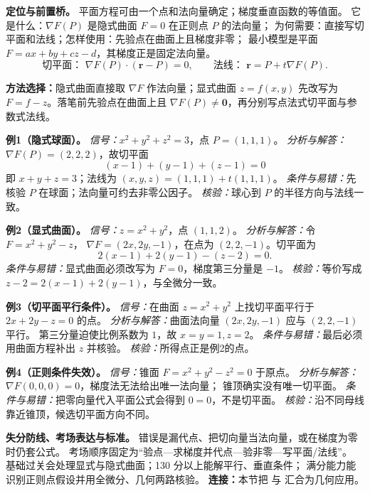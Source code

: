 
\begin{knowledgeBox}
\textbf{定位与前置桥。}
平面方程可由一个点和法向量确定；梯度垂直函数的等值面。
它是什么：\(\nabla F(P)\) 是隐式曲面 \(F=0\) 在正则点 \(P\) 的法向量；
为何需要：直接写切平面和法线；怎样使用：先验点在曲面上且梯度非零；
最小模型是平面 \(F=ax+by+cz-d\)，其梯度正是固定法向量。
\[
\text{切平面： }\nabla F(P)\cdot(\boldsymbol r-P)=0,\qquad
\text{法线： }\boldsymbol r=P+t\nabla F(P).
\]

\textbf{方法选择：}隐式曲面直接取 \(\nabla F\) 作法向量；显式曲面
\(z=f(x,y)\) 先改写为 \(F=f-z\)。落笔前先验点在曲面上且
\(\nabla F(P)\ne\boldsymbol0\)，再分别写点法式切平面与参数式法线。

\textbf{例1（隐式球面）。}
\emph{信号：}\(x^2+y^2+z^2=3\)，点 \(P=(1,1,1)\)。
\emph{分析与解答：}\(\nabla F(P)=(2,2,2)\)，故切平面
\[
(x-1)+(y-1)+(z-1)=0
\]
即 \(x+y+z=3\)；法线为
\((x,y,z)=(1,1,1)+t(1,1,1)\)。
\emph{条件与易错：}先核验 \(P\) 在球面；法向量可约去非零公因子。
\emph{核验：}球心到 \(P\) 的半径方向与法线一致。

\textbf{例2（显式曲面）。}
\emph{信号：}\(z=x^2+y^2\)，点 \((1,1,2)\)。
\emph{分析与解答：}令 \(F=x^2+y^2-z\)，
\(\nabla F=(2x,2y,-1)\)，在点为 \((2,2,-1)\)。切平面为
\[
2(x-1)+2(y-1)-(z-2)=0.
\]
\emph{条件与易错：}显式曲面必须改写为 \(F=0\)，梯度第三分量是 \(-1\)。
\emph{核验：}等价写成 \(z-2=2(x-1)+2(y-1)\)，与全微分一致。

\textbf{例3（切平面平行条件）。}
\emph{信号：}在曲面 \(z=x^2+y^2\) 上找切平面平行于
\(2x+2y-z=0\) 的点。
\emph{分析与解答：}曲面法向量 \((2x,2y,-1)\) 应与 \((2,2,-1)\) 平行。
第三分量迫使比例系数为 \(1\)，故 \(x=y=1,z=2\)。
\emph{条件与易错：}最后必须用曲面方程补出 \(z\) 并核验。
\emph{核验：}所得点正是例2的点。

\textbf{例4（正则条件失效）。}
\emph{信号：}锥面 \(F=x^2+y^2-z^2=0\) 于原点。
\emph{分析与解答：}\(\nabla F(0,0,0)=0\)，梯度法无法给出唯一法向量；
锥顶确实没有唯一切平面。
\emph{条件与易错：}把零向量代入平面公式会得到 \(0=0\)，不是切平面。
\emph{核验：}沿不同母线靠近锥顶，候选切平面方向不同。

\textbf{失分防线、考场表达与标准。}
错误是漏代点、把切向量当法向量，或在梯度为零时仍套公式。
考场顺序固定为“验点—求梯度并代点—验非零—写平面/法线”。
基础过关会处理显式与隐式曲面；130 分以上能解平行、垂直条件；
满分能力能识别正则点假设并用全微分、几何两路核验。
\textbf{连接：}本节把
与
汇合为几何应用。
\end{knowledgeBox}
